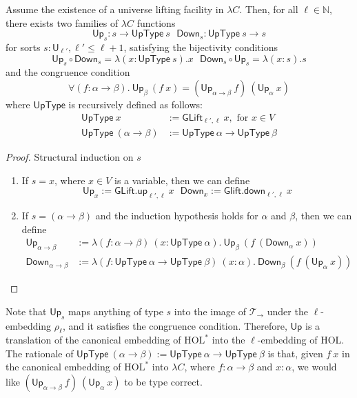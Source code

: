   \begin{theorem} Assume the existence of a universe lifting facility in $\lambda C$. Then,
    for all $\ell \in \mathbb{N}$, there exists two families of $\lambda C$ functions
    $$\mathsf{Up}_s : s \to \mathsf{UpType} \ s \ \ \ \mathsf{Down}_s : \mathsf{UpType} \ s \to s$$
    for sorts $s : \mathsf{U}_{\ell'}, \ell' \leq \ell + 1$, satisfying the bijectivity conditions
    $$\mathsf{Up}_s \circ \mathsf{Down}_s = \lambda (x : \mathsf{UpType} \ s). x \ \ \
      \mathsf{Down}_s \circ \mathsf{Up}_s = \lambda (x : s). s$$
    and the congruence condition
    $$\forall (f : \alpha \to \beta). \ \mathsf{Up}_\beta \ (f \ x) = (\mathsf{Up}_{\alpha \to \beta} \ f) \ (\mathsf{Up}_\alpha \ x)$$
    where $\mathsf{UpType}$ is recursively defined as follows:
    $$\begin{aligned}
    \mathsf{UpType} \ x & := \mathsf{GLift}_{\ell', \ell} \ x, \text{ for } x \in V \\
    \mathsf{UpType} \ (\alpha \to \beta) & := \mathsf{UpType} \ \alpha \to \mathsf{UpType} \ \beta
    \end{aligned}$$
    \begin{proof}
      Structural induction on $s$
      \begin{enumerate}
        \item If $s = x$, where $x \in V$ is a variable, then we can define
          $$\mathsf{Up}_x := \mathsf{GLift.up}_{\ell', \ell} \ x \ \ \ \mathsf{Down}_x := \mathsf{Glift.down}_{\ell', \ell} \ x$$
        \item If $s = (\alpha \to \beta)$ and the induction hypothesis holds for $\alpha$ and $\beta$, then we can define
          $$\begin{aligned}
          \mathsf{Up}_{\alpha \to \beta} &:= \lambda (f : \alpha \to \beta) \ (x : \mathsf{UpType} \ \alpha). \ \mathsf{Up}_\beta \ (f \ (\mathsf{Down}_\alpha \ x)) \\
          \mathsf{Down}_{\alpha \to \beta} &:= \lambda (f : \mathsf{UpType} \ \alpha \to \mathsf{UpType} \ \beta) \ (x : \alpha). \ \mathsf{Down}_\beta \ (f \ (\mathsf{Up}_\alpha \ x))
          \end{aligned}$$
      \end{enumerate}
    \end{proof}
  \end{theorem}

  \noindent Note that $\mathsf{Up}_s$ maps anything of type $s$ into the image of $\mathcal{T}_\to$ under
  the $\ell$-embedding $\rho_\ell$, and it satisfies the congruence condition. Therefore, $\mathsf{Up}$
  is a translation of the canonical embedding of $\text{HOL}^*$ into the $\ell$-embedding of HOL. The rationale of
  $\mathsf{UpType} \ (\alpha \to \beta) := \mathsf{UpType} \ \alpha \to \mathsf{UpType} \ \beta$
  is that, given $f \ x$ in the canonical embedding of $\text{HOL}^*$ into $\lambda C$, where $f : \alpha \to \beta$ and
  $x : \alpha$, we would like $(\mathsf{Up}_{\alpha \to \beta} \ f) \ (\mathsf{Up}_\alpha \ x)$ to be type correct.